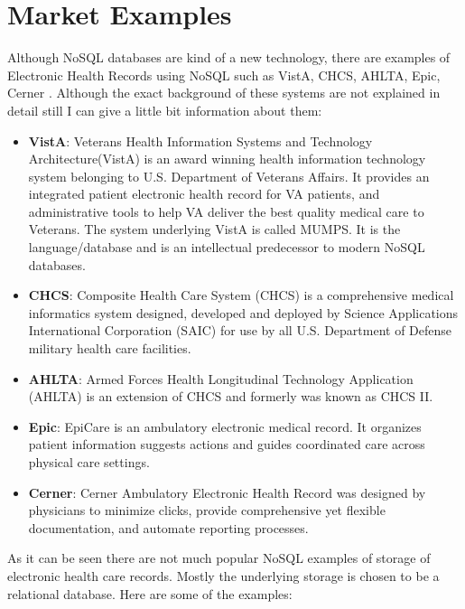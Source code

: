 \documentclass{article}
\begin{document}
\section{Market Examples}
Although NoSQL databases are kind of a new technology, there are examples of Electronic Health Records using NoSQL such as VistA, CHCS, AHLTA, Epic, Cerner \cite{online4}. Although the exact background of these systems are not explained in detail still I can give a little bit information about them:
\begin{itemize}
	\item \textbf{VistA}: Veterans Health Information Systems and Technology Architecture(VistA) is an award winning health information technology system belonging to U.S. Department of Veterans Affairs. It provides an integrated patient electronic health record for VA patients, and administrative tools to help VA deliver the best quality medical care to Veterans\cite{online8}. The system underlying VistA is called MUMPS. It is the language/database and is an intellectual predecessor to modern NoSQL databases\cite{online7}.
	\item \textbf{CHCS}: Composite Health Care System (CHCS) is a comprehensive medical informatics system designed, developed and deployed by Science Applications International Corporation (SAIC) for use by all U.S. Department of Defense military health care facilities\cite{online9}.
	\item \textbf{AHLTA}: Armed Forces Health Longitudinal Technology Application (AHLTA) is an extension of CHCS and formerly was known as CHCS II\cite{online10}. 
	\item \textbf{Epic}: EpiCare is an ambulatory electronic medical record. It organizes patient information suggests actions and guides coordinated care across physical care settings\cite{online11}.
	\item \textbf{Cerner}: Cerner Ambulatory Electronic Health Record was designed by physicians to minimize clicks, provide comprehensive yet flexible documentation, and automate reporting processes\cite{online12}.
\end{itemize}

As it can be seen there are not much popular NoSQL examples of storage of electronic health care records. Mostly the underlying storage is chosen to be a relational database. Here are some of the examples:
\end{document}
